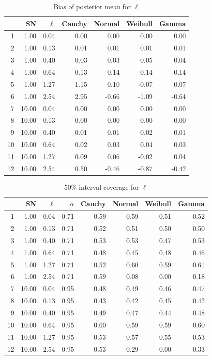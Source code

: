 \documentclass{article}
\begin{document}
\begin{table}[htbp]
\centering
\caption {Bias of posterior mean for $\ell$} \label{bias_ell} 
\begin{tabular}{rrrrrrr}
	 & SN & $\ell$ & Cauchy & Normal & Weibull & Gamma \\ 
  \hline
	1 & 1.00 & 0.04 & 0.00 & 0.00 & 0.00 & 0.00 \\ 
  2 & 1.00 & 0.13 & 0.01 & 0.01 & 0.01 & 0.01 \\ 
  3 & 1.00 & 0.40 & 0.03 & 0.03 & 0.05 & 0.04 \\ 
  4 & 1.00 & 0.64 & 0.13 & 0.14 & 0.14 & 0.14 \\ 
  5 & 1.00 & 1.27 & 1.15 & 0.10 & -0.07 & 0.07 \\ 
  6 & 1.00 & 2.54 & 2.95 & -0.66 & -1.09 & -0.64 \\ 
  7 & 10.00 & 0.04 & 0.00 & 0.00 & 0.00 & 0.00 \\ 
  8 & 10.00 & 0.13 & 0.00 & 0.00 & 0.00 & 0.00 \\ 
  9 & 10.00 & 0.40 & 0.01 & 0.01 & 0.02 & 0.01 \\ 
  10 & 10.00 & 0.64 & 0.02 & 0.03 & 0.04 & 0.03 \\ 
  11 & 10.00 & 1.27 & 0.09 & 0.06 & -0.02 & 0.04 \\ 
  12 & 10.00 & 2.54 & 0.50 & -0.46 & -0.87 & -0.42 \\ 
   \hline
\end{tabular}
\end{table}


\begin{table}[htbp]
\centering
\caption {50\% interval coverage for $\ell$} \label{50_cover_ell} 
\begin{tabular}{rrrrrrrr}
  \hline
 & SN & $\ell$ & $\alpha$ & Cauchy & Normal & Weibull & Gamma \\ 
  \hline
1 & 1.00 & 0.04 & 0.71 & 0.59 & 0.59 & 0.51 & 0.52 \\ 
  2 & 1.00 & 0.13 & 0.71 & 0.52 & 0.51 & 0.50 & 0.50 \\ 
  3 & 1.00 & 0.40 & 0.71 & 0.53 & 0.53 & 0.47 & 0.53 \\ 
  4 & 1.00 & 0.64 & 0.71 & 0.48 & 0.45 & 0.48 & 0.46 \\ 
  5 & 1.00 & 1.27 & 0.71 & 0.52 & 0.60 & 0.59 & 0.61 \\ 
  6 & 1.00 & 2.54 & 0.71 & 0.59 & 0.08 & 0.00 & 0.18 \\ 
  7 & 10.00 & 0.04 & 0.95 & 0.48 & 0.49 & 0.46 & 0.47 \\ 
  8 & 10.00 & 0.13 & 0.95 & 0.43 & 0.42 & 0.45 & 0.42 \\ 
  9 & 10.00 & 0.40 & 0.95 & 0.49 & 0.47 & 0.44 & 0.48 \\ 
  10 & 10.00 & 0.64 & 0.95 & 0.60 & 0.59 & 0.59 & 0.60 \\ 
  11 & 10.00 & 1.27 & 0.95 & 0.53 & 0.57 & 0.55 & 0.53 \\ 
  12 & 10.00 & 2.54 & 0.95 & 0.53 & 0.29 & 0.00 & 0.33 \\ 
   \hline
\end{tabular}
\end{table}
\end{document}
